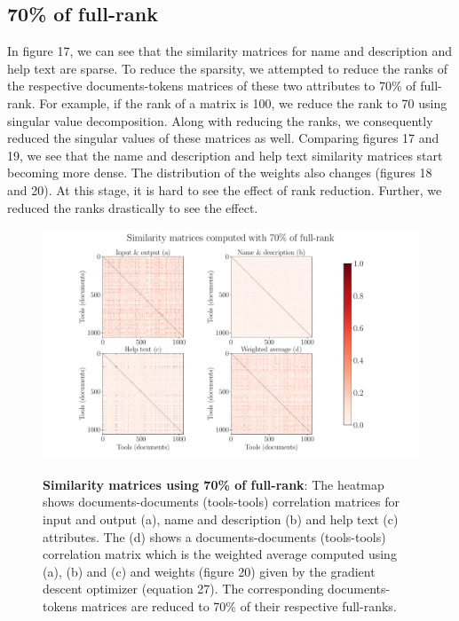\subsection{70\% of full-rank}
In figure 17, we can see that the similarity matrices for name and description and help text are sparse. To reduce the sparsity,  we attempted to reduce the ranks of the respective documents-tokens matrices of these two attributes to 70\% of full-rank. For example, if the rank of a matrix is 100, we reduce the rank to 70 using singular value decomposition. Along with reducing the ranks, we consequently reduced the singular values of these matrices as well. Comparing figures 17 and 19, we see that the name and description and help text similarity matrices start becoming more dense. The distribution of the weights also changes (figures 18 and 20). At this stage, it is hard to see the effect of rank reduction. Further, we reduced the ranks drastically to see the effect.

\begin{figure}[h]
\begin{centering}
    {\includegraphics[scale=0.4]{figures/Similarity_matrices_070.pdf}}
    \caption[Similarity matrices computed using document-tokens matrices reduced to 70\% of their full-rank]{\textbf{Similarity matrices using 70\% of full-rank}: The heatmap shows documents-documents (tools-tools) correlation matrices for input and output (a), name and description (b) and help text (c) attributes. The (d) shows a documents-documents (tools-tools) correlation matrix which is the weighted average computed using (a), (b) and (c) and weights (figure 20) given by the gradient descent optimizer (equation 27). The corresponding documents-tokens matrices are reduced to 70\% of their respective full-ranks.}
\end{centering}
\end{figure}

